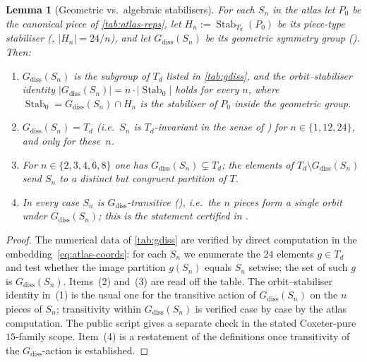 \documentclass[11pt,a4paper]{article}
\theoremstyle{plain}
\newtheorem{lemma}[lemma]{Lemma}
\theoremstyle{definition}
\theoremstyle{remark}
\DeclareMathOperator{\Stab}{Stab}
\newcommand{\Td}{T_{\!d}}
\begin{document}
\begin{lemma}[Geometric vs.\ algebraic stabilisers]\label{lem:geom-vs-alg-stab}
For each $S_{n}$ in the atlas let $P_{0}$ be the canonical piece of
\cref{tab:atlas-reps}, let $H_{n} := \Stab_{\Td}(P_{0})$ be its
piece-type stabiliser (, $|H_{n}| = 24/n$), and let
$G_{\mathrm{diss}}(S_{n})$ be its geometric symmetry group
().  Then:
\begin{enumerate}
\item $G_{\mathrm{diss}}(S_{n})$ is the subgroup of $\Td$ listed in
      \cref{tab:gdiss}, and the orbit--stabiliser identity
      $|G_{\mathrm{diss}}(S_{n})| = n \cdot |\Stab_{0}|$
      holds for every $n$, where
      $\Stab_{0} = G_{\mathrm{diss}}(S_{n}) \cap H_{n}$ is the stabiliser
      of $P_{0}$ inside the geometric group.
\item $G_{\mathrm{diss}}(S_{n}) = \Td$ (i.e.\ $S_{n}$ is $\Td$-invariant
      in the sense of ) for
      $n \in \{1,12,24\}$, and only for these~$n$.
\item For $n \in \{2,3,4,6,8\}$ one has
      $G_{\mathrm{diss}}(S_{n}) \subsetneq \Td$; the elements of
      $\Td \setminus G_{\mathrm{diss}}(S_{n})$ send $S_{n}$ to a
      \emph{distinct} but congruent partition of $T$.
\item In every case $S_{n}$ is $G_{\mathrm{diss}}$-transitive
      (), i.e.\ the $n$ pieces form a single
      orbit under $G_{\mathrm{diss}}(S_{n})$; this is the statement
      certified in .
\end{enumerate}
\end{lemma}

\begin{proof}
The numerical data of \cref{tab:gdiss} are verified by direct
computation in the embedding~\eqref{eq:atlas-coords}: for each $S_{n}$
we enumerate the $24$ elements $g \in \Td$ and test whether the image
partition $g(S_{n})$ equals $S_{n}$ setwise; the set of such $g$ is
$G_{\mathrm{diss}}(S_{n})$.  Items~(2) and~(3) are read off the
table.  The orbit--stabiliser identity in~(1) is the usual one for the
transitive action of $G_{\mathrm{diss}}(S_{n})$ on the $n$ pieces of
$S_{n}$; transitivity within $G_{\mathrm{diss}}(S_{n})$ is verified case
by case by the atlas computation.  The public script
 gives a separate check in the stated
Coxeter-pure $15$-family scope.  Item~(4) is a restatement of the definitions
once transitivity of the $G_{\mathrm{diss}}$-action is established.
\end{proof}
\end{document}
